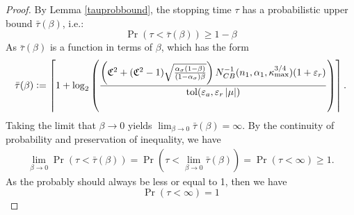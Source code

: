 \documentclass{iitthesis}
\begin{document}
\begin{proof}
By Lemma \ref{tauprobbound}, the stopping time $\tau$ has a probabilistic upper bound $\bar{\tau}(\beta)$,  i.e.:
$$\Pr(\tau < \bar{\tau}(\beta)) \geq 1-\beta$$
As $\bar{\tau}(\beta)$ is a function in terms of $\beta$, which has the form
$$\bar{\tau}(\beta):= \left \lceil 1+\log_2 \left(\frac{\left(\mathfrak{C}^2+(\mathfrak{C}^2-1)\sqrt{\frac{\alpha_{\sigma}(1-\beta)}{(1-\alpha_{\sigma})\beta}}\right) N_{CB}^{-1}(n_1,\alpha_1,\kappa_{\max}^{3/4})(1+\varepsilon_r)}{ \operatorname{tol}(\varepsilon_a,\varepsilon_r \left \lvert \mu \right \rvert)}\right) \right \rceil.$$
Taking the limit that $\beta \to 0$ yields $\lim_{\beta \to 0} \bar{\tau}(\beta) = \infty$. By the continuity of probability and preservation of inequality, we have
\begin{align}
\lim_{\beta \to 0} \Pr(\tau  <\bar{\tau}(\beta)) = \Pr(\tau  <\lim_{\beta \to 0}\bar{\tau}(\beta)) 
= \Pr(\tau < \infty)  \geq 1.
\end{align}
As the probably should always be less or equal to 1, then we have
$$\Pr(\tau < \infty)  = 1$$
\end{proof}
\end{document}
